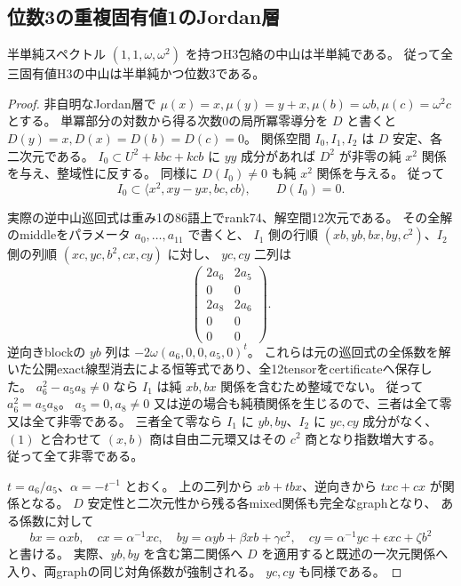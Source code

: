 \subsection{位数3の重複固有値1のJordan層}
\label{subsec:cubic-third-root-unit-Jordan}
\begin{theorem}
\label{thm:cubic-third-root-unit-Jordan-empty}
半単純スペクトル $(1,1,\omega,\omega^2)$ を持つH3包絡の中山は半単純である。
従って全三固有値H3の中山は半単純かつ位数3である。
\end{theorem}
\begin{proof}
非自明なJordan層で
$\mu(x)=x,\mu(y)=y+x,\mu(b)=\omega b,\mu(c)=\omega^2c$ とする。
単冪部分の対数から得る次数0の局所冪零導分を $D$ と書くと
$D(y)=x,D(x)=D(b)=D(c)=0$。
関係空間 $I_0,I_1,I_2$ は $D$ 安定、各二次元である。
$I_0\subset U^2+kbc+kcb$ に $yy$ 成分があれば $D^2$ が非零の純 $x^2$ 関係を与え、整域性に反する。
同様に $D(I_0)\ne0$ も純 $x^2$ 関係を与える。
従って
\[
 I_0\subset\langle x^2,xy-yx,bc,cb\rangle,\qquad D(I_0)=0.
\tag{1}
\]

実際の逆中山巡回式は重み1の86語上でrank74、解空間12次元である。
その全解のmiddleをパラメータ $a_0,\ldots,a_{11}$ で書くと、
$I_1$ 側の行順 $(xb,yb,bx,by,c^2)$、$I_2$ 側の列順 $(xc,yc,b^2,cx,cy)$ に対し、
$yc,cy$ 二列は
\[
 \begin{pmatrix}2a_6&2a_5\\0&0\\2a_8&2a_6\\0&0\\0&0\end{pmatrix}.
\]
逆向きblockの $yb$ 列は
$-2\omega(a_6,0,0,a_5,0)^t$。
これらは元の巡回式の全係数を解いた公開exact線型消去による恒等式であり、全12tensorをcertificateへ保存した。
$a_6^2-a_5a_8\ne0$ なら $I_1$ は純 $xb,bx$ 関係を含むため整域でない。
従って $a_6^2=a_5a_8$。
$a_5=0,a_8\ne0$ 又は逆の場合も純積関係を生じるので、三者は全て零又は全て非零である。
三者全て零なら $I_1$ に $yb,by$、$I_2$ に $yc,cy$ 成分がなく、
$(1)$ と合わせて $(x,b)$ 商は自由二元環又はその $c^2$ 商となり指数増大する。
従って全て非零である。

$t=a_6/a_5$、$\alpha=-t^{-1}$ とおく。
上の二列から $xb+t bx$、逆向きから $t xc+cx$ が関係となる。
$D$ 安定性と二次元性から残る各mixed関係も完全なgraphとなり、
ある係数に対して
\[
 bx=\alpha xb,\quad cx=\alpha^{-1}xc,\quad
 by=\alpha yb+\beta xb+\gamma c^2,\quad
 cy=\alpha^{-1}yc+\epsilon xc+\zeta b^2
\tag{2}
\]
と書ける。
実際、$yb,by$ を含む第二関係へ $D$ を適用すると既述の一次元関係へ入り、両graphの同じ対角係数が強制される。
$yc,cy$ も同様である。


\end{proof}
